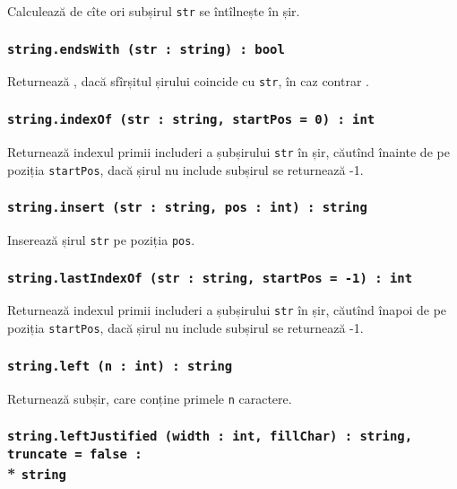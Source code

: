 Calculează de cîte ori subșirul \texttt{str} se întîlnește în șir.

\subsubsection{\texttt{string.endsWith (str : string) : bool}}

Returnează \true{}, dacă sfîrșitul șirului coincide cu \texttt{str}, în caz contrar \false{}.

\subsubsection{\texttt{string.indexOf (str : string, startPos = 0) : int}}

Returnează indexul primii includeri a șubșirului \texttt{str} în șir, căutînd înainte de pe poziția \texttt{startPos}, dacă șirul nu include subșirul se returnează -1.

\subsubsection{\texttt{string.insert (str : string, pos : int) : string}}

Inserează șirul \texttt{str} pe poziția \texttt{pos}.

\subsubsection{\texttt{string.lastIndexOf (str : string, startPos = -1) : int}}

Returnează indexul primii includeri a șubșirului \texttt{str} în șir, căutînd înapoi de pe poziția \texttt{startPos}, dacă șirul nu include subșirul se returnează -1.

\subsubsection{\texttt{string.left (n : int) : string}}

Returnează subșir, care conține primele \texttt{n} caractere.

\subsubsection{\texttt{string.leftJustified (width : int, fillChar) : string, truncate = false :}\\* \texttt{string}}

